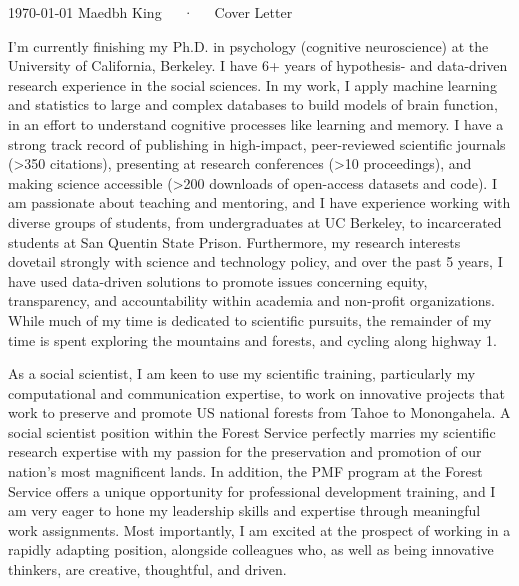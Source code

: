 \documentclass[9pt, a4paper]{maedbh-cv}
\begin{document}
\makecvheader[R]

\makecvfooter
  {\today}
  {Maedbh King~~~·~~~Cover Letter}
  {}
  
\makelettertitle

\begin{cvletter}

I'm currently finishing my Ph.D. in psychology (cognitive neuroscience) at the University of California, Berkeley. I have 6+ years of hypothesis- and data-driven research experience in the social sciences. In my work, I apply machine learning and statistics to large and complex databases to build models of brain function, in an effort to understand cognitive processes like learning and memory. I have a strong track record of publishing in high-impact, peer-reviewed scientific journals (>350 citations), presenting at research conferences (>10 proceedings), and making science accessible (>200 downloads of open-access datasets and code). I am passionate about teaching and mentoring, and I have experience working with diverse groups of students, from undergraduates at UC Berkeley, to incarcerated students at San Quentin State Prison. Furthermore, my research interests dovetail strongly with science and technology policy, and over the past 5 years, I have used data-driven solutions to promote issues concerning equity, transparency, and accountability within academia and non-profit organizations. While much of my time is dedicated to scientific pursuits, the remainder of my time is spent exploring the mountains and forests, and cycling along highway 1. 

As a social scientist, I am keen to use my scientific training, particularly my computational and communication expertise, to work on innovative projects that work to preserve and promote US national forests from Tahoe to Monongahela. A social scientist position within the Forest Service perfectly marries my scientific research expertise with my passion for the preservation and promotion of our nation's most magnificent lands. In addition, the PMF program at the Forest Service offers a unique opportunity for professional development training, and I am very eager to hone my leadership skills and expertise through meaningful work assignments. Most importantly, I am excited at the prospect of working in a rapidly adapting position, alongside colleagues who, as well as being innovative thinkers, are creative, thoughtful, and driven. 


\end{cvletter}
\end{document}
